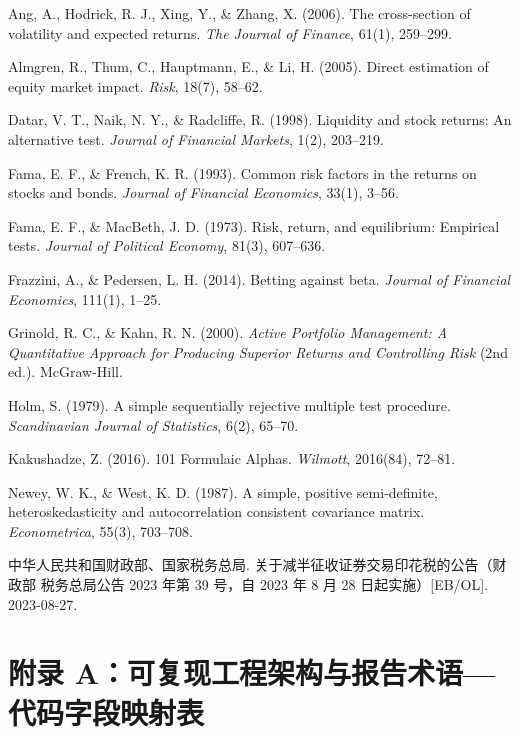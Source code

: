 \documentclass[12pt,a4paper]{article}
\let\origsection\section
\renewcommand{\section}[1]{\needspace{6.5\baselineskip}\origsection{#1}}
\begin{document}
{\setlength{\parindent}{0pt}\fontsize{10.5pt}{15.5pt}\selectfont
\begin{enumerate}[leftmargin=2.1em, itemsep=3.5pt, topsep=0pt, label={[\arabic*]}]
  \item Ang, A., Hodrick, R. J., Xing, Y., \& Zhang, X. (2006). The cross-section of volatility and expected returns. \textit{The Journal of Finance}, 61(1), 259--299.
  \item Almgren, R., Thum, C., Hauptmann, E., \& Li, H. (2005). Direct estimation of equity market impact. \textit{Risk}, 18(7), 58--62.
  \item Datar, V. T., Naik, N. Y., \& Radcliffe, R. (1998). Liquidity and stock returns: An alternative test. \textit{Journal of Financial Markets}, 1(2), 203--219.
  \item Fama, E. F., \& French, K. R. (1993). Common risk factors in the returns on stocks and bonds. \textit{Journal of Financial Economics}, 33(1), 3--56.
  \item Fama, E. F., \& MacBeth, J. D. (1973). Risk, return, and equilibrium: Empirical tests. \textit{Journal of Political Economy}, 81(3), 607--636.
  \item Frazzini, A., \& Pedersen, L. H. (2014). Betting against beta. \textit{Journal of Financial Economics}, 111(1), 1--25.
  \item Grinold, R. C., \& Kahn, R. N. (2000). \textit{Active Portfolio Management: A Quantitative Approach for Producing Superior Returns and Controlling Risk} (2nd ed.). McGraw-Hill.
  \item Holm, S. (1979). A simple sequentially rejective multiple test procedure. \textit{Scandinavian Journal of Statistics}, 6(2), 65--70.
  \item Kakushadze, Z. (2016). 101 Formulaic Alphas. \textit{Wilmott}, 2016(84), 72--81.
  \item Newey, W. K., \& West, K. D. (1987). A simple, positive semi-definite, heteroskedasticity and autocorrelation consistent covariance matrix. \textit{Econometrica}, 55(3), 703--708.
  \item 中华人民共和国财政部、国家税务总局. 关于减半征收证券交易印花税的公告（财政部 税务总局公告 2023 年第 39 号，自 2023 年 8 月 28 日起实施）[EB/OL]. 2023-08-27.
\end{enumerate}\par}

\vspace{10pt}

\section{附录 A：可复现工程架构与报告术语—代码字段映射表}
\end{document}
